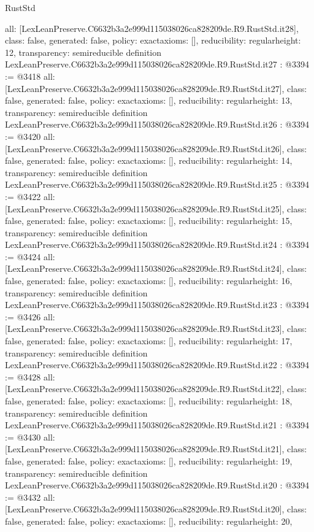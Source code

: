 \begin{lexlean}{RustStd}
\begin{coremodule}
{  all: [LexLeanPreserve.C6632b3a2e999d115038026ca828209de.R9.RustStd.it28],
  class: false,
  generated: false,
  policy: exact{axioms: []},
  reducibility: regular{height: 12},
  transparency: semireducible
}
definition LexLeanPreserve.C6632b3a2e999d115038026ca828209de.R9.RustStd.it27 : @3394 := @3418 {
  all: [LexLeanPreserve.C6632b3a2e999d115038026ca828209de.R9.RustStd.it27],
  class: false,
  generated: false,
  policy: exact{axioms: []},
  reducibility: regular{height: 13},
  transparency: semireducible
}
definition LexLeanPreserve.C6632b3a2e999d115038026ca828209de.R9.RustStd.it26 : @3394 := @3420 {
  all: [LexLeanPreserve.C6632b3a2e999d115038026ca828209de.R9.RustStd.it26],
  class: false,
  generated: false,
  policy: exact{axioms: []},
  reducibility: regular{height: 14},
  transparency: semireducible
}
definition LexLeanPreserve.C6632b3a2e999d115038026ca828209de.R9.RustStd.it25 : @3394 := @3422 {
  all: [LexLeanPreserve.C6632b3a2e999d115038026ca828209de.R9.RustStd.it25],
  class: false,
  generated: false,
  policy: exact{axioms: []},
  reducibility: regular{height: 15},
  transparency: semireducible
}
definition LexLeanPreserve.C6632b3a2e999d115038026ca828209de.R9.RustStd.it24 : @3394 := @3424 {
  all: [LexLeanPreserve.C6632b3a2e999d115038026ca828209de.R9.RustStd.it24],
  class: false,
  generated: false,
  policy: exact{axioms: []},
  reducibility: regular{height: 16},
  transparency: semireducible
}
definition LexLeanPreserve.C6632b3a2e999d115038026ca828209de.R9.RustStd.it23 : @3394 := @3426 {
  all: [LexLeanPreserve.C6632b3a2e999d115038026ca828209de.R9.RustStd.it23],
  class: false,
  generated: false,
  policy: exact{axioms: []},
  reducibility: regular{height: 17},
  transparency: semireducible
}
definition LexLeanPreserve.C6632b3a2e999d115038026ca828209de.R9.RustStd.it22 : @3394 := @3428 {
  all: [LexLeanPreserve.C6632b3a2e999d115038026ca828209de.R9.RustStd.it22],
  class: false,
  generated: false,
  policy: exact{axioms: []},
  reducibility: regular{height: 18},
  transparency: semireducible
}
definition LexLeanPreserve.C6632b3a2e999d115038026ca828209de.R9.RustStd.it21 : @3394 := @3430 {
  all: [LexLeanPreserve.C6632b3a2e999d115038026ca828209de.R9.RustStd.it21],
  class: false,
  generated: false,
  policy: exact{axioms: []},
  reducibility: regular{height: 19},
  transparency: semireducible
}
definition LexLeanPreserve.C6632b3a2e999d115038026ca828209de.R9.RustStd.it20 : @3394 := @3432 {
  all: [LexLeanPreserve.C6632b3a2e999d115038026ca828209de.R9.RustStd.it20],
  class: false,
  generated: false,
  policy: exact{axioms: []},
  reducibility: regular{height: 20},
}
\end{coremodule}
\end{lexlean}
